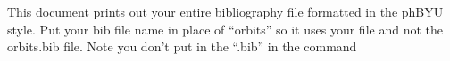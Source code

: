 
	This document prints out your entire bibliography file formatted in the phBYU style. Put your bib file name in place of ``orbits'' so it uses your file and not the orbits.bib file.  Note you don't put in the ``.bib'' in the \verbatum{} command
	\nocite{*}
    
    
